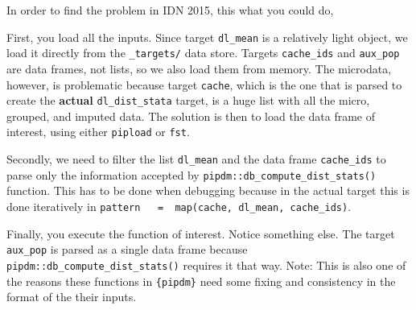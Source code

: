 \documentclass[
]{book}
\newenvironment{Shaded}{\begin{snugshade}}{\end{snugshade}}
\newcommand{\AttributeTok}[1]{\textcolor[rgb]{0.77,0.63,0.00}{#1}}
\newcommand{\CommentTok}[1]{\textcolor[rgb]{0.56,0.35,0.01}{\textit{#1}}}
\newcommand{\DecValTok}[1]{\textcolor[rgb]{0.00,0.00,0.81}{#1}}
\newcommand{\FunctionTok}[1]{\textcolor[rgb]{0.00,0.00,0.00}{#1}}
\newcommand{\NormalTok}[1]{#1}
\newcommand{\OtherTok}[1]{\textcolor[rgb]{0.56,0.35,0.01}{#1}}
\newcommand{\SpecialCharTok}[1]{\textcolor[rgb]{0.00,0.00,0.00}{#1}}
\newcommand{\StringTok}[1]{\textcolor[rgb]{0.31,0.60,0.02}{#1}}
\begin{document}
In order to find the problem in IDN 2015, this what you could do,

\begin{Shaded}
\end{Shaded}

First, you load all the inputs. Since target \texttt{dl\_mean} is a relatively light
object, we load it directly from the \texttt{\_targets/} data store. Targets \texttt{cache\_ids}
and \texttt{aux\_pop} are data frames, not lists, so we also load them from memory. The
microdata, however, is problematic because target \texttt{cache}, which is the one that
is parsed to create the \textbf{actual} \texttt{dl\_dist\_stata} target, is a huge list with
all the micro, grouped, and imputed data. The solution is then to load the data
frame of interest, using either \texttt{pipload} or \texttt{fst}.

Secondly, we need to filter the list \texttt{dl\_mean} and the data frame \texttt{cache\_ids} to
parse only the information accepted by \texttt{pipdm::db\_compute\_dist\_stats()}
function. This has to be done when debugging because in the actual target this
is done iteratively in \texttt{pattern\ \ \ =\ \ map(cache,\ dl\_mean,\ cache\_ids)}.

Finally, you execute the function of interest. Notice something else. The target
\texttt{aux\_pop} is parsed as a single data frame because
\texttt{pipdm::db\_compute\_dist\_stats()} requires it that way.
{Note:} This is also one of the reasons these functions in
\texttt{\{pipdm\}} need some fixing and consistency in the format of the their inputs.

  
\end{document}
